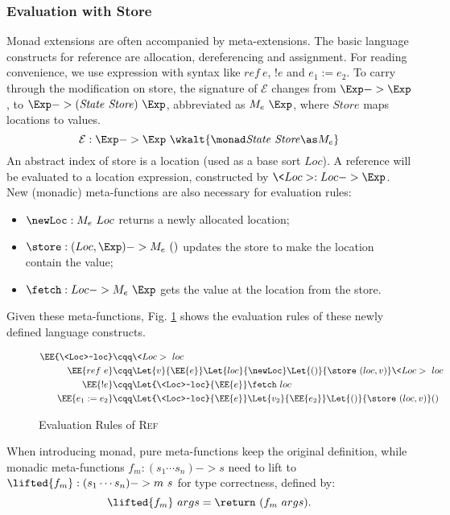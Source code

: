 \subsubsection{Evaluation with Store}
Monad extensions are often accompanied by meta-extensions.
The basic language constructs for reference are allocation, dereferencing and assignment.
For reading convenience, we use expression with syntax like $ref~e$, $!e$ and $e_1:=e_2$.
To carry through the modification on store, 
 the signature of $\mathcal{E}$ changes from $\Exp->\Exp$,
 to $\Exp->(\mathit{State~Store})~\Exp$, abbreviated as $M_e~\Exp$,
 where $\mathit{Store}$ maps locations to values.
\[ \mathcal{E} : \Exp -> \Exp ~\wkalt{\monad \mathit{State~Store} \as M_e} \]
An abstract index of store is a location (used as a base sort $Loc$).
A reference will be evaluated to a location expression, constructed by $\<Loc>:Loc->\Exp$.
New (monadic) meta-functions are also necessary for evaluation rules:
\begin{itemize}
  \item $\newLoc:M_e~Loc$ returns a newly allocated location;
  \item $\store:(Loc,\Exp)->M_e~()$ updates the store to make the location contain the value;
  \item $\fetch:Loc->M_e~\Exp$ gets the value at the location from the store.
\end{itemize}
Given these meta-functions, Fig. \ref{fig:ref_eval} shows the evaluation rules of these newly defined language constructs.

\begin{figure}
  \begin{align*}
    \EE{\<Loc>~loc} & \cqq \<Loc>~loc \\
    \EE{ref~e} & \cqq \Let{v}{\EE{e}} \Let{loc}{\newLoc} \Let{()}{\store~(loc,v)} \<Loc>~loc \\
    \EE{!e} & \cqq \Let{\<Loc>~loc}{\EE{e}} \fetch~loc \\
    \EE{e_1:=e_2} & \cqq \Let{\<Loc>~loc}{\EE{e}} \Let{v_2}{\EE{e_2}} \Let{()}{\store~(loc,v)} ()
  \end{align*}
  \caption{Evaluation Rules of \textsc{Ref}}
  \label{fig:ref_eval}
\end{figure}

When introducing monad, pure meta-functions keep the original definition, 
 while monadic meta-functions $f_m:(s_1\cdots s_n)->s$ need to lift to $\lifted{f_m}:(s_1\cdots s_n)->m~s$ for type correctness, defined by:
\[ \lifted{f_m}~args = \return~(f_m~args). \]

